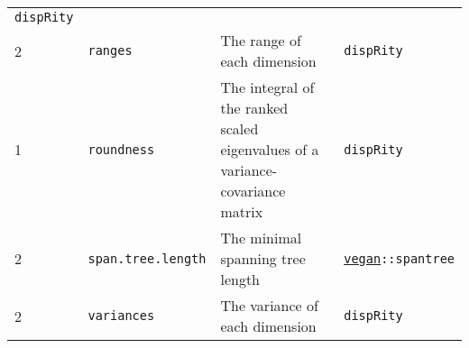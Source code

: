 \documentclass[
]{book}
\begin{document}
\begin{longtable}[]{@{}llll@{}}
\begin{minipage}[t]{0.10\columnwidth}
\texttt{dispRity}\strut
\end{minipage}\tabularnewline
\begin{minipage}[t]{0.07\columnwidth}\raggedright
2\strut
\end{minipage} & \begin{minipage}[t]{0.07\columnwidth}\raggedright
\texttt{ranges}\strut
\end{minipage} & \begin{minipage}[t]{0.64\columnwidth}\raggedright
The range of each dimension\strut
\end{minipage} & \begin{minipage}[t]{0.10\columnwidth}\raggedright
\texttt{dispRity}\strut
\end{minipage}\tabularnewline
\begin{minipage}[t]{0.07\columnwidth}\raggedright
1\strut
\end{minipage} & \begin{minipage}[t]{0.07\columnwidth}\raggedright
\texttt{roundness}\strut
\end{minipage} & \begin{minipage}[t]{0.64\columnwidth}\raggedright
The integral of the ranked scaled eigenvalues of a variance-covariance matrix\strut
\end{minipage} & \begin{minipage}[t]{0.10\columnwidth}\raggedright
\texttt{dispRity}\strut
\end{minipage}\tabularnewline
\begin{minipage}[t]{0.07\columnwidth}\raggedright
2\strut
\end{minipage} & \begin{minipage}[t]{0.07\columnwidth}\raggedright
\texttt{span.tree.length}\strut
\end{minipage} & \begin{minipage}[t]{0.64\columnwidth}\raggedright
The minimal spanning tree length\strut
\end{minipage} & \begin{minipage}[t]{0.10\columnwidth}\raggedright
\href{https://cran.r-project.org/web/packages/vegan/index.html}{\texttt{vegan}}\texttt{::spantree}\strut
\end{minipage}\tabularnewline
\begin{minipage}[t]{0.07\columnwidth}\raggedright
2\strut
\end{minipage} & \begin{minipage}[t]{0.07\columnwidth}\raggedright
\texttt{variances}\strut
\end{minipage} & \begin{minipage}[t]{0.64\columnwidth}\raggedright
The variance of each dimension\strut
\end{minipage} & \begin{minipage}[t]{0.10\columnwidth}\raggedright
\texttt{dispRity}\strut
\end{minipage}\tabularnewline
\bottomrule
\end{longtable}
\end{document}
